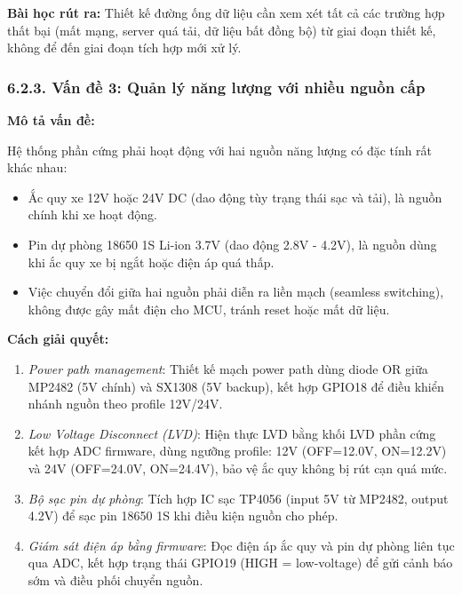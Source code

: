 \documentclass[13pt,a4paper]{extarticle}
\renewcommand{\\}{\thesislongtableorignewline\hline}%
\providecommand{\tightlist}{%
  \setlength{\itemsep}{0pt}\setlength{\parskip}{0pt}}
\begin{document}
\textbf{Bài học rút ra:} Thiết kế đường ống dữ liệu cần xem xét tất cả
các trường hợp thất bại (mất mạng, server quá tải, dữ liệu bất đồng bộ)
từ giai đoạn thiết kế, không để đến giai đoạn tích hợp mới xử lý.

\subsubsection{6.2.3. Vấn đề 3: Quản lý năng lượng với nhiều nguồn
cấp}\label{623-vux1ea5n-ux111ux1ec1-3-quux1ea3n-luxfd-nux103ng-lux1b0ux1ee3ng-vux1edbi-nhiux1ec1u-nguux1ed3n-cux1ea5p}

\textbf{Mô tả vấn đề:}

Hệ thống phần cứng phải hoạt động với hai nguồn năng lượng có đặc tính
rất khác nhau:

\begin{itemize}
\tightlist
\item
  Ắc quy xe 12V hoặc 24V DC (dao động tùy trạng thái sạc và tải), là
  nguồn chính khi xe hoạt động.
\item
  Pin dự phòng 18650 1S Li-ion 3.7V (dao động 2.8V - 4.2V), là nguồn
  dùng khi ắc quy xe bị ngắt hoặc điện áp quá thấp.
\item
  Việc chuyển đổi giữa hai nguồn phải diễn ra liền mạch (seamless
  switching), không được gây mất điện cho MCU, tránh reset hoặc mất dữ
  liệu.
\end{itemize}

\textbf{Cách giải quyết:}

\begin{enumerate}
\def\labelenumi{\arabic{enumi}.}
\tightlist
\item
  \emph{Power path management}: Thiết kế mạch power path dùng diode OR
  giữa MP2482 (5V chính) và SX1308 (5V backup), kết hợp GPIO18 để điều
  khiển nhánh nguồn theo profile 12V/24V.
\item
  \emph{Low Voltage Disconnect (LVD)}: Hiện thực LVD bằng khối LVD phần
  cứng kết hợp ADC firmware, dùng ngưỡng profile: 12V (OFF=12.0V,
  ON=12.2V) và 24V (OFF=24.0V, ON=24.4V), bảo vệ ắc quy không bị rút cạn
  quá mức.
\item
  \emph{Bộ sạc pin dự phòng}: Tích hợp IC sạc TP4056 (input 5V từ
  MP2482, output 4.2V) để sạc pin 18650 1S khi điều kiện nguồn cho phép.
\item
  \emph{Giám sát điện áp bằng firmware}: Đọc điện áp ắc quy và pin dự
  phòng liên tục qua ADC, kết hợp trạng thái GPIO19 (HIGH = low-voltage)
  để gửi cảnh báo sớm và điều phối chuyển nguồn.
\end{enumerate}
\end{document}

